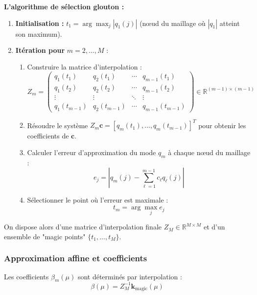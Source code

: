 \documentclass[12pt,a4paper]{article}
\begin{document}
\vspace{0.5cm}
\textbf{L'algorithme de sélection glouton \cite{barrault2004} :}

\begin{enumerate}
\item \textbf{Initialisation :} $t_1 = \arg\max_j |q_1(j)|$ (nœud du maillage où $|q_1|$ atteint son maximum).

\item \textbf{Itération pour } $m = 2, \ldots, M$ :
\begin{enumerate}
\item Construire la matrice d'interpolation :
\begin{equation*}
Z_m = \begin{pmatrix}
q_1(t_1) & q_2(t_1) & \cdots & q_{m-1}(t_1) \\
q_1(t_2) & q_2(t_2) & \cdots & q_{m-1}(t_2) \\
\vdots & \vdots & \ddots & \vdots \\
q_1(t_{m-1}) & q_2(t_{m-1}) & \cdots & q_{m-1}(t_{m-1})
\end{pmatrix} \in \mathbb{R}^{(m-1) \times (m-1)}
\end{equation*}
\item Résoudre le système $Z_m \mathbf{c} = [q_m(t_1), \ldots, q_m(t_{m-1})]^T$ pour obtenir les coefficients de $\mathbf{c}$.
\item Calculer l'erreur d'approximation du mode $q_m$ à chaque nœud du maillage :
\begin{equation*}
e_j = \left| q_m(j) - \sum_{\ell=1}^{m-1} c_{\ell} q_{\ell}(j) \right|
\end{equation*}
\item Sélectionner le point où l'erreur est maximale :
\begin{equation*}
t_m = \arg\max_j e_j
\end{equation*}
\end{enumerate}
\end{enumerate}
On dispose alors d'une matrice d'interpolation finale $Z_M \in \mathbb{R}^{M \times M}$ et d'un ensemble de "magic points" $\{t_1, \ldots, t_M\}$.

\subsubsection{Approximation affine et coefficients}

Les coefficients $\beta_m(\mu)$ sont déterminés par interpolation :
\begin{equation*}
\beta(\mu) = Z_M^{-1} \mathbf{k}_{\text{magic}}(\mu)
\end{equation*}
\end{document}
